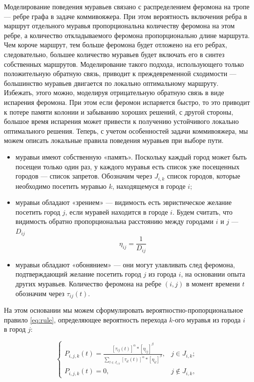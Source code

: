 \documentclass[12pt]{report}
\begin{document}
Моделирование поведения муравьев связано с распределением феромона на тропе — ребре графа в задаче коммивояжера. При этом вероятность включения ребра в маршрут отдельного муравья пропорциональна количеству феромона на этом ребре, а количество откладываемого феромона пропорционально длине маршрута. Чем короче маршрут, тем больше феромона будет отложено на его ребрах, следовательно, большее количество муравьев будет включать его в синтез собственных маршрутов. Моделирование такого подхода, использующего только положительную обратную связь, приводит к преждевременной сходимости — большинство муравьев двигается по локально оптимальному маршруту. Избежать, этого можно, моделируя отрицательную обратную связь в виде испарения феромона. При этом если феромон испаряется быстро, то это приводит к потере памяти колонии и забыванию хороших решений, с другой стороны, большое время испарения может привести к получению устойчивого локально оптимального решения. Теперь, с учетом особенностей задачи коммивояжера, мы можем описать локальные правила поведения муравьев при выборе пути.

\begin{itemize}
	\item муравьи имеют собственную «память». Поскольку каждый город может быть посещеи только один раз, у каждого муравья есть список уже посещенных городов --- список запретов. Обозначим через $J_{i,k}$ список городов, которые необходимо посетить муравью $k$, находящемуся в городе $i$;
	\item муравьи обладают «зрением» --- видимость есть эвристическое желание посетить город $j$, если муравей находится в городе $i$. Будем считать, что видимость обратно пропорциональна расстоянию между городами $i$ и $j$ --- $D_{ij}$ 
	\begin{equation}
	\label{eq:vision}
	\eta_{ij} = \frac{1}{D_{ij}}
	\end{equation}
	\item муравьи обладают «обонянием» — они могут улавливать след феромона, подтверждающий желание посетить город $j$ из города $i$, на основании опыта других муравьев. Количество феромона на ребре $(i,j)$ в момент времени $t$ обозначим через $\tau_{ij}(t)$.
\end{itemize}

На этом  основании мы можем сформулировать вероятностно-пропорциональное правило \ref{eq:rule}, определяющее вероятность перехода $k$-ого муравья из города $i$ в город $j$:

\begin{equation}
	\label{eq:rule}
	\begin{cases}
	P_{i,j,k}(t) = \frac{[\tau_{ij}(t)]^\alpha*[\eta_{ij}]^\beta}{\sum_{l\in J_{i,k}}^{}[\tau_{il}(t)]^\alpha * [\eta_{il}]^\beta}, & j \in J_{i,k};\\
	P_{i,j,k}(t) = 0, & j \notin J_{i,k},
	\end{cases}
\end{equation}
\end{document}
